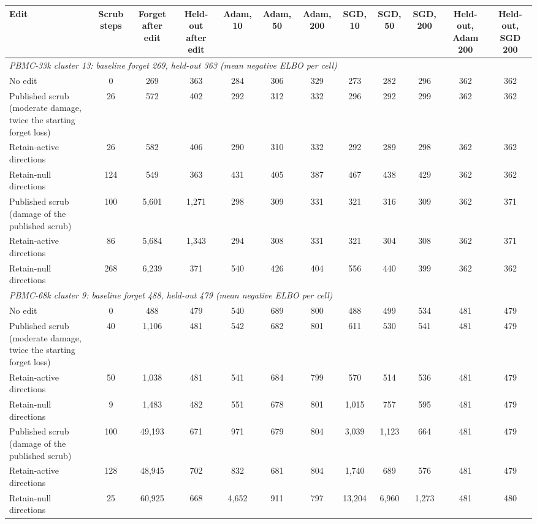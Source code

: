 \begin{tabular}{lccccccccccc}
\toprule
Edit & Scrub steps & Forget after edit & Held-out after edit & Adam, 10 & Adam, 50 & Adam, 200 & SGD, 10 & SGD, 50 & SGD, 200 & Held-out, Adam 200 & Held-out, SGD 200 \\
\midrule
\multicolumn{12}{l}{\emph{PBMC-33k cluster 13: baseline forget 269, held-out 363 (mean negative ELBO per cell)}} \\
No edit & 0 & 269 & 363 & 284 & 306 & 329 & 273 & 282 & 296 & 362 & 362 \\
Published scrub (moderate damage, twice the starting forget loss) & 26 & 572 & 402 & 292 & 312 & 332 & 296 & 292 & 299 & 362 & 362 \\
Retain-active directions & 26 & 582 & 406 & 290 & 310 & 332 & 292 & 289 & 298 & 362 & 362 \\
Retain-null directions & 124 & 549 & 363 & 431 & 405 & 387 & 467 & 438 & 429 & 362 & 362 \\
Published scrub (damage of the published scrub) & 100 & 5,601 & 1,271 & 298 & 309 & 331 & 321 & 316 & 309 & 362 & 371 \\
Retain-active directions & 86 & 5,684 & 1,343 & 294 & 308 & 331 & 321 & 304 & 308 & 362 & 371 \\
Retain-null directions & 268 & 6,239 & 371 & 540 & 426 & 404 & 556 & 440 & 399 & 362 & 362 \\
\midrule
\multicolumn{12}{l}{\emph{PBMC-68k cluster 9: baseline forget 488, held-out 479 (mean negative ELBO per cell)}} \\
No edit & 0 & 488 & 479 & 540 & 689 & 800 & 488 & 499 & 534 & 481 & 479 \\
Published scrub (moderate damage, twice the starting forget loss) & 40 & 1,106 & 481 & 542 & 682 & 801 & 611 & 530 & 541 & 481 & 479 \\
Retain-active directions & 50 & 1,038 & 481 & 541 & 684 & 799 & 570 & 514 & 536 & 481 & 479 \\
Retain-null directions & 9 & 1,483 & 482 & 551 & 678 & 801 & 1,015 & 757 & 595 & 481 & 479 \\
Published scrub (damage of the published scrub) & 100 & 49,193 & 671 & 971 & 679 & 804 & 3,039 & 1,123 & 664 & 481 & 479 \\
Retain-active directions & 128 & 48,945 & 702 & 832 & 681 & 804 & 1,740 & 689 & 576 & 481 & 479 \\
Retain-null directions & 25 & 60,925 & 668 & 4,652 & 911 & 797 & 13,204 & 6,960 & 1,273 & 481 & 480 \\
\bottomrule
\end{tabular}
